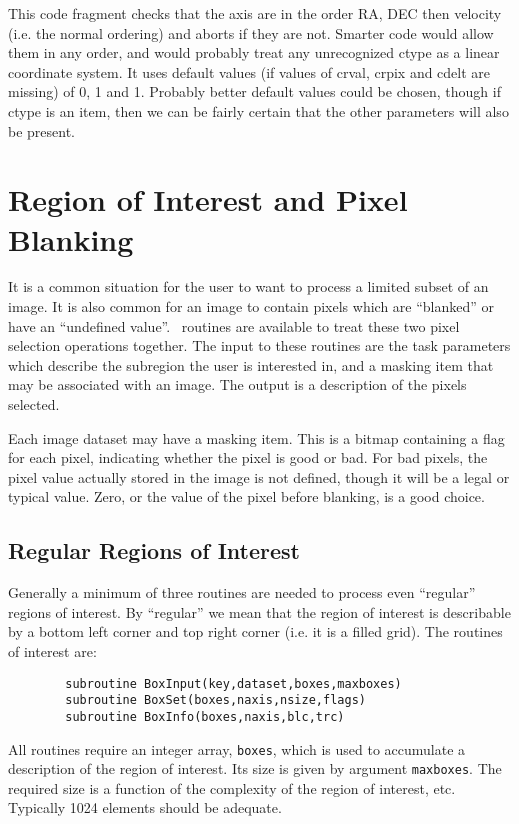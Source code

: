 \documentclass{report}
\begin{document}
This code fragment checks that the  axis are in the order RA, DEC then velocity
(i.e. the normal ordering)
and aborts if they are not. Smarter code would allow them in any order, and
would probably treat any unrecognized ctype as a linear coordinate system.
It uses default values (if values of crval, crpix and cdelt are missing)
of 0, 1 and 1. Probably better default values could be chosen, though if
ctype is an item, then we can be fairly certain that the other parameters
will also be present.

\section{Region of Interest and Pixel Blanking}
It is a common situation for the user to want to process a limited subset
of an image. It is also common for an image to contain pixels which are
``blanked'' or have an ``undefined value''. \miriad\ routines are available to
treat these two pixel selection operations together. The input to these
routines are the task parameters which describe the subregion the user
is interested in, and a masking item that may be associated with an image.
The output is a description of the pixels selected.

Each image dataset may have a masking item. This
is a bitmap containing a flag for each pixel, indicating
whether the pixel is good or bad. For bad pixels, the pixel value actually
stored
in the image is not defined, though it will be a legal or typical value.
Zero, or the value of the pixel before blanking, is a good choice.

\subsection{Regular Regions of Interest}
Generally a minimum of three routines are needed to process even ``regular''
regions of interest. By ``regular'' we mean that the region of interest is
describable by a bottom left corner and top right corner (i.e. it is a filled
grid). The routines of interest are:
\begin{verbatim}
        subroutine BoxInput(key,dataset,boxes,maxboxes)
        subroutine BoxSet(boxes,naxis,nsize,flags)
        subroutine BoxInfo(boxes,naxis,blc,trc)
\end{verbatim}
All routines require an integer array, {\tt boxes}, which is used to
accumulate a description of the region of interest. Its size is given
by argument {\tt maxboxes}. The required size is a function of the
complexity of the region of interest, etc. Typically 1024 elements
should be adequate.
\end{document}
